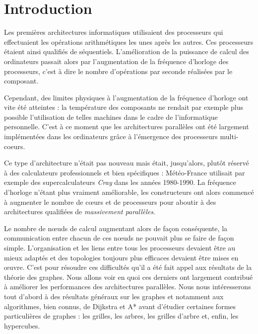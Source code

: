 \section*{Introduction}

Les premières architectures informatiques utilisaient des processeurs qui effectuaient les opérations arithmétiques les unes après les autres. Ces processeurs étaient ainsi qualifiés de séquentiels. L'amélioration de la puissance de calcul des ordinateurs passait alors par l'augmentation de la fréquence d'horloge des processeurs, c'est à dire le nombre d'opérations par seconde réalisées par le composant.

Cependant, des limites physiques à l'augmentation de la fréquence d'horloge ont vite été atteintes : la température des composants ne rendait par exemple plus possible l'utilisation de telles machines dans le cadre de l'informatique personnelle. C'est à ce moment que les architectures parallèles ont été largement implémentées dans les ordinateurs grâce à l'émergence des processeurs multi-coeurs.

Ce type d'architecture n'était pas nouveau mais était, jusqu'alors, plutôt réservé à des calculateurs professionnels et bien spécifiques : Météo-France utilisait par exemple des supercalculateurs \textit{Cray} dans les années 1980-1990. La fréquence d'horloge n'étant plus vraiment améliorable, les constructeurs ont alors commencé à augmenter le nombre de cœurs et de processeurs pour aboutir à des architectures qualifiées de \textit{massivement parallèles}.

Le nombre de nœuds de calcul augmentant alors de façon conséquente, la communication entre chacun de ces nœuds ne pouvait plus se faire de façon simple. L'organisation et les liens entre tous les processeurs devaient être au mieux adaptés et des topologies toujours plus efficaces devaient être mises en œuvre. C'est pour résoudre ces difficultés qu'il a été fait appel aux résultats de la théorie des graphes. Nous allons voir en quoi ces derniers ont largement contribué à améliorer les performances des architectures parallèles. Nous nous intéresserons tout d'abord à des résultats généraux sur les graphes et notamment aux algorithmes, bien connus, de Dijkstra et A* avant d'étudier certaines formes particulières de graphes : les grilles, les arbres, les grilles d'arbre et, enfin, les hypercubes.
